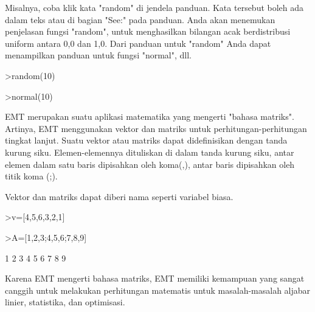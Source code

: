 \documentclass[a4paper,10pt]{article}
\begin{document}
\begin{eulernotebook}
\begin{eulercomment}
\begin{eulercomment}
\begin{eulercomment}
\begin{eulercomment}
\begin{eulercomment}
Misalnya, coba klik kata "random" di jendela panduan. Kata tersebut
boleh ada dalam teks atau di bagian "See:" pada panduan. Anda akan
menemukan penjelasan fungsi "random", untuk menghasilkan bilangan acak
berdistribusi uniform antara 0,0 dan 1,0. Dari panduan untuk "random"
Anda dapat menampilkan panduan untuk fungsi "normal", dll.
\end{eulercomment}
\begin{eulerprompt}
>random(10)
\end{eulerprompt}
\begin{euleroutput}
  [0.270906,  0.704419,  0.217693,  0.445363,  0.308411,  0.914541,  0.193585,
  0.463387,  0.095153,  0.595017]
\end{euleroutput}
\begin{eulerprompt}
>normal(10)
\end{eulerprompt}
\begin{euleroutput}
  [-0.495418,  1.6463,  -0.390056,  -1.98151,  3.44132,  0.308178,  -0.733427,
  -0.526167,  1.10018,  0.108453]
\end{euleroutput}
\begin{eulercomment}
EMT merupakan suatu aplikasi matematika yang mengerti "bahasa matriks". Artinya,
EMT menggunakan vektor dan matriks untuk perhitungan-perhitungan tingkat lanjut.
Suatu vektor atau matriks dapat didefinisikan dengan tanda kurung siku.
Elemen-elemennya dituliskan di dalam tanda kurung siku, antar elemen dalam satu
baris dipisahkan oleh koma(,), antar baris dipisahkan oleh titik koma (;).

Vektor dan matriks dapat diberi nama seperti variabel biasa.
\end{eulercomment}
\begin{eulerprompt}
>v=[4,5,6,3,2,1]
\end{eulerprompt}
\begin{euleroutput}
  [4,  5,  6,  3,  2,  1]
\end{euleroutput}
\begin{eulerprompt}
>A=[1,2,3;4,5,6;7,8,9]
\end{eulerprompt}
\begin{euleroutput}
              1             2             3 
              4             5             6 
              7             8             9 
\end{euleroutput}
\begin{eulercomment}
Karena EMT mengerti bahasa matriks, EMT memiliki kemampuan yang sangat canggih
untuk melakukan perhitungan matematis untuk masalah-masalah aljabar linier,
statistika, dan optimisasi.


\end{eulercomment}
\end{eulercomment}
\end{eulercomment}
\end{eulercomment}
\end{eulercomment}
\end{eulernotebook}
\end{document}

